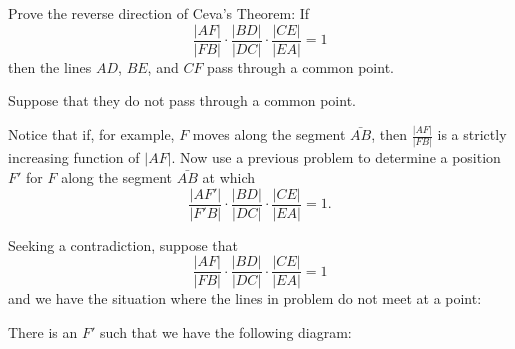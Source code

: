 \documentclass[newpage,hints,handout,nooutcomes,noauthor,12pt]{ximera}
\begin{document}
\begin{problem}
Prove the reverse direction of Ceva's Theorem: If%
\[
\frac{|AF|}{|FB|}\cdot\frac{|BD|}{|DC|}\cdot\frac{|CE|}{|EA|}=1
\]
then the lines $AD$, $BE$, and $CF$ pass through a common point.
\begin{hint}
Suppose that they do not pass through a common point.
\begin{image}
\end{image}
\end{hint}
\begin{hint}
Notice that if, for example, $F$ moves along the segment $\bar{AB}$,
then $\frac{|AF|}{|FB|}$ is a strictly increasing function of
$|AF|$. Now use a previous problem to determine a position $F'$ for
$F$ along the segment $\bar{AB}$ at which
\[
\frac{|AF'|}{|F'B|}\cdot\frac{|BD|}{|DC|}\cdot\frac{|CE|}{|EA|}=1.
\]
\end{hint}
\begin{freeResponse}
Seeking a contradiction, suppose that 
\[
\frac{|AF|}{|FB|}\cdot\frac{|BD|}{|DC|}\cdot\frac{|CE|}{|EA|}=1
\]
and we have the situation where the lines in problem do not meet at a point:
\begin{image}
\end{image}
There is an $F'$ such that we have the following diagram:
\begin{image}
\end{image}
\end{freeResponse}
\end{problem}
\end{document}
